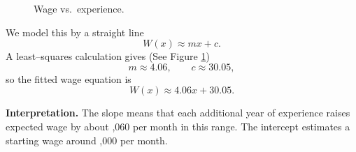 \begin{example}
\begin{figure}[h]

\caption{Wage vs.\ experience.}
\label{fig:linear-fit}
\end{figure}

We model this by a straight line
\[
W(x) \approx mx + c.
\]
A least--squares calculation gives (See Figure \ref{fig:linear-fit})
\[
m \approx 4.06,\qquad c \approx 30.05,
\]
so the fitted wage equation is
\[
\boxed{\,W(x) \approx 4.06x + 30.05.\,}
\]

\noindent
\textbf{Interpretation.}
The slope means that each additional year of experience raises expected
wage by about ,060 per month in this range.  The intercept estimates a
starting wage around ,000 per month.

\end{example}

